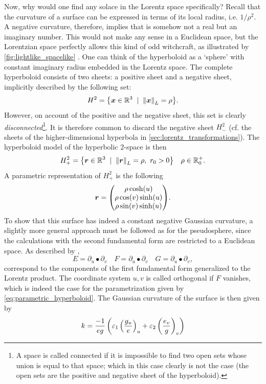 Now, why would one find any solace in the Lorentz space specifically? Recall that the curvature of a surface can be expressed in terms of its local radius, i.e. \(1/\rho^2\). A negative curvature, therefore, implies that  is somehow not a real but an imaginary number. This would not make any sense in a Euclidean space, but the Lorentzian space perfectly allows this kind of odd witchcraft, as illustrated by \cref{fig:lightlike_spacelike} \cite{Ratcliffe2019}. One can think of the hyperboloid as a `sphere' with constant imaginary radius embedded in the Lorentz space. The complete hyperboloid consists of two sheets: a positive sheet and a negative sheet, implicitly described by the following set: 
\[ H^2 = \qty{\vec{x} \in \real^3\;\mid\;\lnorm{\vec{x}} = \rho}. \]
However, on account of the positive and the negative sheet, this set is clearly \emph{disconnected}\footnote{A space is called connected if it is impossible to find two open sets whose union is equal to that space; which in this case clearly is not the case (the open sets are the positive and negative sheet of the hyperboloid).}. It is therefore common to discard the negative sheet \(H^2_-\) (cf. the sheets of the higher-dimensional hyperbola in \cref{sec:lorentz_transformations}). The hyperboloid model of the hyperbolic 2-space is then \cite{Ratcliffe2019}
\[ H^2_+ = \qty{\vec{r} \in \real^3\;\mid\;\lnorm{\vec{r}} = \rho,\ r_0 > 0} \quad \rho \in \real^+_0. \]
A parametric representation of \(H^2_+\) is the following
\begin{equation}
    \vec{r} = \mqty(\rho\cosh(u)\\\rho\cos(v)\sinh(u)\\\rho\sin(v)\sinh(u)).
    \label{eq:parametric_hyperboloid}
\end{equation}
To show that this surface has indeed a constant negative Gaussian curvature, a slightly more general approach must be followed as for the pseudosphere, since the calculations with the second fundamental form are restricted to a Euclidean space. As described by \citet{ONeill1983},
\[ E = \partial_u \bullet \partial_v \quad F = \partial_u \bullet \partial_v \quad G = \partial_u \bullet \partial_v, \]
correspond to the components of the first fundamental form generalized to the Lorentz product. The coordinate system \(u, v\) is called orthogonal if \(F\) vanishes, which is indeed the case for the parametrization given by \cref{eq:parametric_hyperboloid}.
The Gaussian curvature of the surface is then given by \cite{ONeill1983}
\begin{equation}
    k = \frac{-1}{eg}
    \left(\varepsilon_1\,\qty(\frac{g_u}{e})_u + \varepsilon_2\,\qty(\frac{e_v}{g})_v\right)
    \label{eq:orthogonal_gaussian_curvature}
\end{equation}
